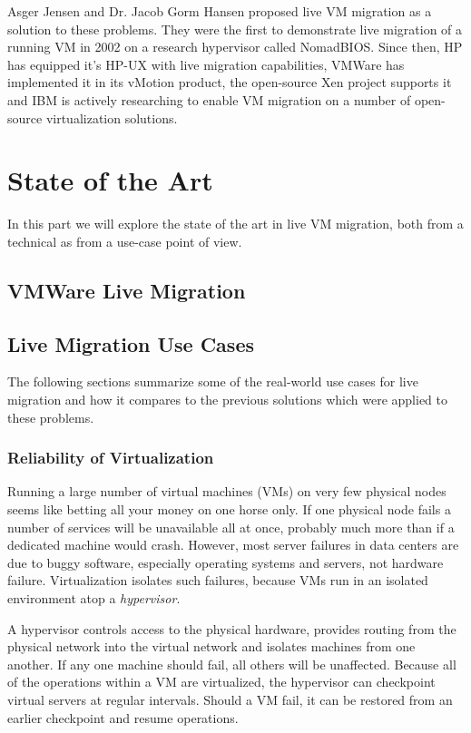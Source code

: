 \documentclass[a4paper]{IEEEtran}
\begin{document}
Asger Jensen and Dr. Jacob Gorm Hansen proposed live VM migration as a
solution to these problems. They were the first to demonstrate live
migration of a running VM in 2002 on a research hypervisor called
NomadBIOS. Since then, HP has equipped it's HP-UX with live migration
capabilities, VMWare has implemented it in its vMotion product, the
open-source Xen project supports it and IBM is actively researching to
enable VM migration on a number of open-source virtualization
solutions.

\section{State of the Art}
\label{sec:sota}

In this part we will explore the state of the art in live VM
migration, both from a technical as from a use-case point of view.

\subsection{VMWare Live Migration}
\label{sec:livemigration}
\blindtext

\subsection{Live Migration Use Cases}

The following sections summarize some of the real-world use cases for
live migration and how it compares to the previous solutions which
were applied to these problems.

\subsubsection{Reliability of Virtualization}

Running a large number of virtual machines (VMs) on very few physical
nodes seems like betting all your money on one horse only. If one
physical node fails a number of services will be unavailable all at
once, probably much more than if a dedicated machine would
crash. However, most server failures in data centers are due to buggy
software, especially operating systems and servers, not hardware
failure. Virtualization isolates such failures, because VMs run in an
isolated environment atop a \emph{hypervisor}.

A hypervisor controls access to the physical hardware, provides
routing from the physical network into the virtual network and
isolates machines from one another. If any one machine should fail,
all others will be unaffected. Because all of the operations within a
VM are virtualized, the hypervisor can checkpoint virtual servers at
regular intervals. Should a VM fail, it can be restored from an
earlier checkpoint and resume operations.
\end{document}
